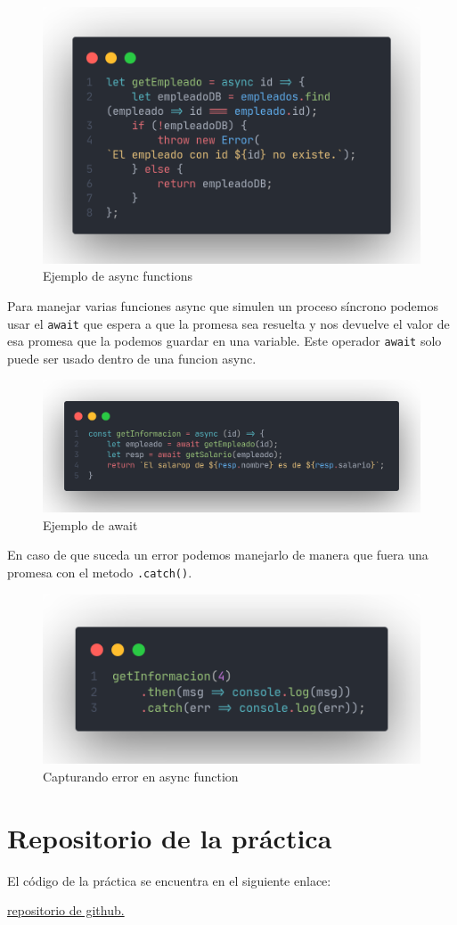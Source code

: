 \documentclass[12pt]{article}
\begin{document}
\begin{figure}[H]
	\centering
	\includegraphics[scale=.3]{assets/images/async.png}
	\caption{Ejemplo de async functions}
\end{figure}

Para manejar varias funciones async que simulen un proceso síncrono podemos usar el \lstinline{await} que espera a que la promesa sea resuelta y nos devuelve el valor de esa promesa que la podemos guardar en una variable. 
Este operador \lstinline{await} solo puede ser usado dentro de una funcion async.

\begin{figure}[H]
	\centering
	\includegraphics[scale=.28]{assets/images/await.png}
	\caption{Ejemplo de await}
\end{figure}

En caso de que suceda un error podemos manejarlo de manera que fuera una promesa con el metodo \lstinline{.catch()}.

\begin{figure}[H]
	\centering
	\includegraphics[scale=.3]{assets/images/await-2.png}
	\caption{Capturando error en async function}
\end{figure}
                
\section{Repositorio de la práctica}

El código de la práctica se encuentra en el siguiente enlace: 

\href{https://github.com/WilsonAG/plataformas-web/tree/master/node/02-fundamentos}{repositorio de github.}
\end{document}
